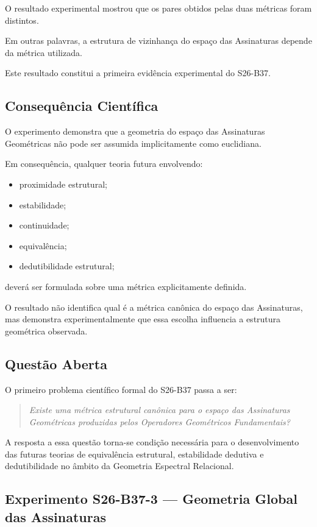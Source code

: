 \documentclass[11pt,a4paper]{article}
\begin{document}
O resultado experimental mostrou que os pares obtidos pelas duas métricas foram
distintos.

Em outras palavras, a estrutura de vizinhança do espaço das Assinaturas depende
da métrica utilizada.

Este resultado constitui a primeira evidência experimental do S26-B37.

\subsection{Consequência Científica}

O experimento demonstra que a geometria do espaço das Assinaturas Geométricas
não pode ser assumida implicitamente como euclidiana.

Em consequência, qualquer teoria futura envolvendo:

\begin{itemize}
\item proximidade estrutural;
\item estabilidade;
\item continuidade;
\item equivalência;
\item dedutibilidade estrutural;
\end{itemize}

deverá ser formulada sobre uma métrica explicitamente definida.

O resultado não identifica qual é a métrica canônica do espaço das
Assinaturas, mas demonstra experimentalmente que essa escolha influencia a
estrutura geométrica observada.

\subsection{Questão Aberta}

O primeiro problema científico formal do S26-B37 passa a ser:

\begin{quote}
\emph{Existe uma métrica estrutural canônica para o espaço das Assinaturas
Geométricas produzidas pelos Operadores Geométricos Fundamentais?}
\end{quote}

A resposta a essa questão torna-se condição necessária para o desenvolvimento
das futuras teorias de equivalência estrutural, estabilidade dedutiva e
dedutibilidade no âmbito da Geometria Espectral Relacional.
\subsection{Experimento S26-B37-3 --- Geometria Global das Assinaturas}
\end{document}
